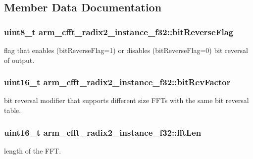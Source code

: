 \subsection{Member Data Documentation}
\subsubsection[{\texorpdfstring{bit\+Reverse\+Flag}{bitReverseFlag}}]{\setlength{\rightskip}{0pt plus 5cm}uint8\+\_\+t arm\+\_\+cfft\+\_\+radix2\+\_\+instance\+\_\+f32\+::bit\+Reverse\+Flag}\hypertarget{structarm__cfft__radix2__instance__f32_af713b4ac5256a19bc965c89fe3005fa3}{}\label{structarm__cfft__radix2__instance__f32_af713b4ac5256a19bc965c89fe3005fa3}
flag that enables (bit\+Reverse\+Flag=1) or disables (bit\+Reverse\+Flag=0) bit reversal of output. 
\subsubsection[{\texorpdfstring{bit\+Rev\+Factor}{bitRevFactor}}]{\setlength{\rightskip}{0pt plus 5cm}uint16\+\_\+t arm\+\_\+cfft\+\_\+radix2\+\_\+instance\+\_\+f32\+::bit\+Rev\+Factor}\hypertarget{structarm__cfft__radix2__instance__f32_ac1688dafa5177f6b1505abbfd0cf8b21}{}\label{structarm__cfft__radix2__instance__f32_ac1688dafa5177f6b1505abbfd0cf8b21}
bit reversal modifier that supports different size F\+F\+Ts with the same bit reversal table. 
\subsubsection[{\texorpdfstring{fft\+Len}{fftLen}}]{\setlength{\rightskip}{0pt plus 5cm}uint16\+\_\+t arm\+\_\+cfft\+\_\+radix2\+\_\+instance\+\_\+f32\+::fft\+Len}\hypertarget{structarm__cfft__radix2__instance__f32_a2f915a1c29635c1623086aaaa726be8f}{}\label{structarm__cfft__radix2__instance__f32_a2f915a1c29635c1623086aaaa726be8f}
length of the F\+FT. 
